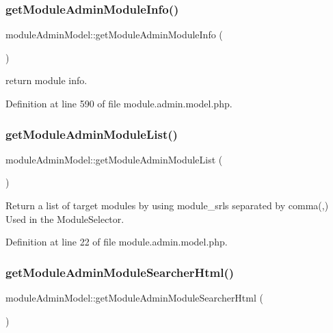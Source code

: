 \subsubsection{\texorpdfstring{get\+Module\+Admin\+Module\+Info()}{getModuleAdminModuleInfo()}}
{\footnotesize\ttfamily module\+Admin\+Model\+::get\+Module\+Admin\+Module\+Info (\begin{DoxyParamCaption}{ }\end{DoxyParamCaption})}

return module info. 

Definition at line 590 of file module.\+admin.\+model.\+php.

\mbox{\label{classmoduleAdminModel_ab87a76519a343b50db20d17983b4d2c7}} 
\subsubsection{\texorpdfstring{get\+Module\+Admin\+Module\+List()}{getModuleAdminModuleList()}}
{\footnotesize\ttfamily module\+Admin\+Model\+::get\+Module\+Admin\+Module\+List (\begin{DoxyParamCaption}{ }\end{DoxyParamCaption})}



Return a list of target modules by using module\+\_\+srls separated by comma(,) Used in the Module\+Selector. 



Definition at line 22 of file module.\+admin.\+model.\+php.

\mbox{\label{classmoduleAdminModel_aca064d49155437d5cad912d1f885933f}} 
\subsubsection{\texorpdfstring{get\+Module\+Admin\+Module\+Searcher\+Html()}{getModuleAdminModuleSearcherHtml()}}
{\footnotesize\ttfamily module\+Admin\+Model\+::get\+Module\+Admin\+Module\+Searcher\+Html (\begin{DoxyParamCaption}{ }\end{DoxyParamCaption})}

